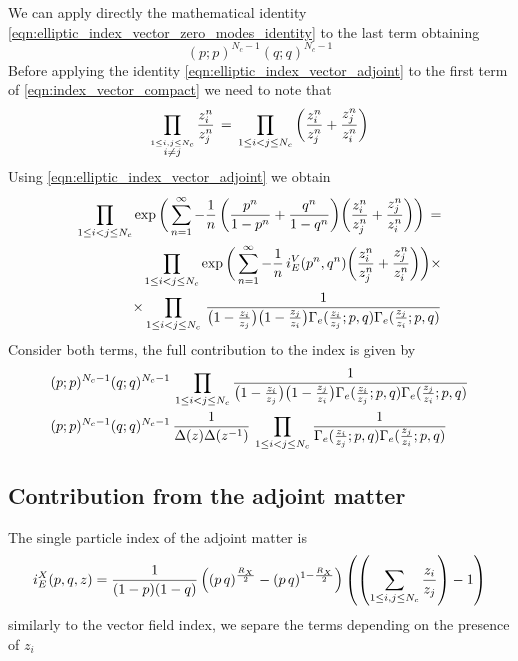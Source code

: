 \begin{appendices}
\begin{equation}
\label{eqn:index_vector_compact}
\end{equation}
We can apply directly the mathematical identity \eqref{eqn:elliptic_index_vector_zero_modes_identity} to the last term obtaining
$$
	(p;p)^{N_c-1} ( q;q)^{N_c-1}
$$
Before applying the identity \eqref{eqn:elliptic_index_vector_adjoint} to the first term of  \eqref{eqn:index_vector_compact} we need to note that 
$$
 \prod_{ \overset{ 1 \leq i,j \leq N_c}{ i\neq j }} {z_i^n \over z_j^n} \,  = \,
  \prod_{ 1 \leq i < j \leq N_c}\bigg( {z_i^n \over z_j^n} + {z_j^n \over z_i^n}   \bigg)
 $$
Using \eqref{eqn:elliptic_index_vector_adjoint} we obtain
\begin{align*}
\prod_{ 1 \leq i < j \leq N_c} \exp \bigg( \sum_{n=1}^{\infty} - {1 \over n} \, \bigg( {p^n \over 1-p^n} + {q^n \over 1-q^n} \bigg)  \bigg( {z_i^n \over z_j^n} + {z_j^n \over z_i^n}\bigg) \bigg) \, =\\
\prod_{ 1 \leq i < j \leq N_c} \exp \bigg( \sum_{n=1}^{\infty} - {1 \over n} \, i_E^V(p^n,q^n)  \bigg( {z_i^n \over z_j^n} + {z_j^n \over z_i^n}\bigg) \bigg) \times
\\
\times  \prod_{ 1 \leq i < j \leq N_c}   \, \frac{ 1 } { \big( 1 -{ z_i \over z_j} \big) \big ( 1 - { z_j \over z_i} \big) \Gamma_e( {z_i \over z_j};p,q) \Gamma_e({z_j \over z_i}; p,q)  }
\end{align*}
Consider both terms, the full contribution to the index is given by  \begin{align*}
& (p;p)^{N_c-1} ( q;q)^{N_c-1} \, \prod_{ 1 \leq i < j \leq N_c} \frac{ 1 }{ \big( 1 -{ z_i \over z_j} \big) \big ( 1 - { z_j \over z_i} \big) \Gamma_e( {z_i \over z_j};p,q) \Gamma_e({z_j \over z_i}; p,q)  } \\
& (p;p)^{N_c-1} ( q;q)^{N_c-1} \, \frac{1}{ \Delta(z) \Delta (z^{-1})} \, \prod_{ 1 \leq i < j \leq N_c} \frac{ 1 }{ \Gamma_e( {z_i \over z_j};p,q) \Gamma_e({z_j \over z_i}; p,q)}
\end{align*}




\subsection{Contribution from the adjoint matter}
The single particle index of the adjoint matter is
\begin{equation}
	i_E^{X}(p,q,z) = {1 \over (1-p)(1-q)}
	\left((p\,q)^{\frac{R_X}{2}}- (p\,q)^{1-\frac{R_X}{2}}\right) \left( \left(  \sum_{ 1 \leq i,j \leq N_c}  {z_i\over z_j}  \right)- 1 \right)
\end{equation}
similarly to the vector field index, we separe the terms depending on the presence of $z_i$


\end{appendices}
